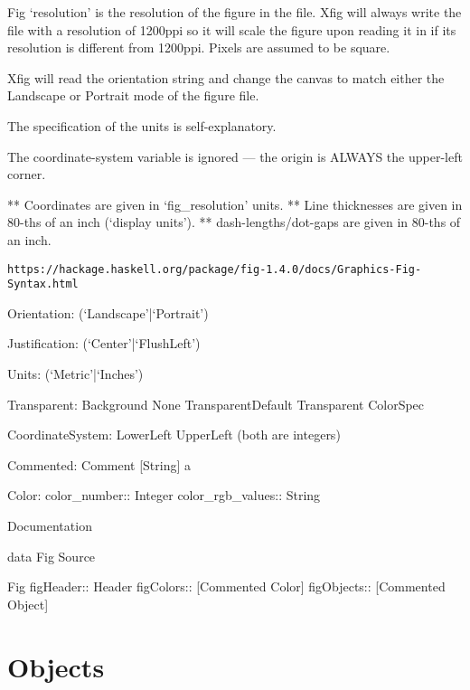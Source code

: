 \documentclass[10pt, a4paper]{article}%
\begin{document}
 Fig `resolution' is the resolution of the figure in the file.
    Xfig will always write the file with a resolution of 1200ppi so it
    will scale the figure upon reading it in if its resolution is different
    from 1200ppi.  Pixels are assumed to be square.

    Xfig will read the orientation string and change the canvas to match
    either the Landscape or Portrait mode of the figure file.

    The specification of the units is self-explanatory.

    The coordinate-system variable is ignored --- the origin is ALWAYS the
    upper-left corner.

    ** Coordinates are given in `fig\_resolution' units.
    ** Line thicknesses are given in 80-ths of an inch (`display units').
    ** dash-lengths/dot-gaps are given in 80-ths of an inch.


\begin{Verbatim}[fontsize=\scriptsize]
https://hackage.haskell.org/package/fig-1.4.0/docs/Graphics-Fig-Syntax.html
\end{Verbatim}





Orientation: (`Landscape'|`Portrait')

Justification: (`Center'|`FlushLeft')

Units: (`Metric'|`Inches')





Transparent:
Background	 
None	 
TransparentDefault	 
Transparent ColorSpec	 


CoordinateSystem:
LowerLeft	 
UpperLeft	 
(both are integers)

Commented:
Comment [String] a	 


Color:
color\_number:: Integer
color\_rgb\_values:: String


Documentation

data Fig
Source

Fig	 
figHeader:: Header
figColors:: [Commented Color]
figObjects:: [Commented Object]


\section{Objects}\label{sec:obj}
\end{document}
